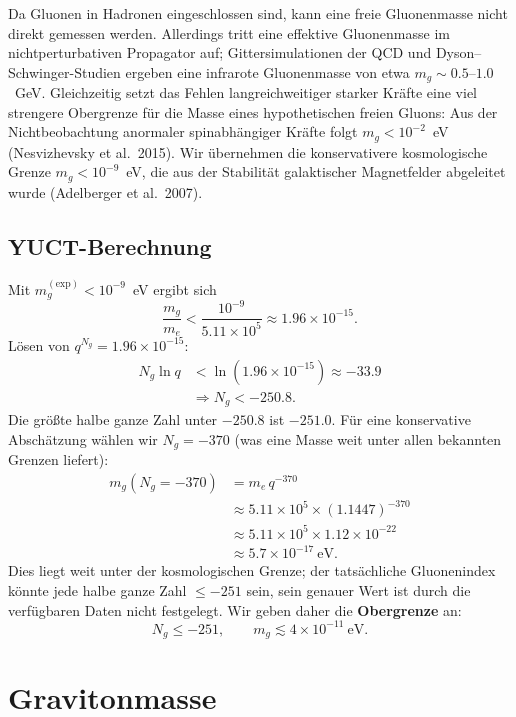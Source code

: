 \documentclass[12pt,a4paper]{article}
\begin{document}
	Da Gluonen in Hadronen eingeschlossen sind, kann eine freie Gluonenmasse nicht direkt gemessen werden.
	Allerdings tritt eine effektive Gluonenmasse im nichtperturbativen Propagator auf; Gittersimulationen der QCD
	und Dyson–Schwinger-Studien ergeben eine infrarote Gluonenmasse von etwa $m_g \sim 0.5$–$1.0$~GeV. Gleichzeitig
	setzt das Fehlen langreichweitiger starker Kräfte eine viel strengere Obergrenze für die Masse eines hypothetischen
	freien Gluons: Aus der Nichtbeobachtung anormaler spinabhängiger Kräfte folgt $m_g < 10^{-2}$~eV (Nesvizhevsky et al.\ 2015).
	Wir übernehmen die konservativere kosmologische Grenze $m_g < 10^{-9}$~eV, die aus der Stabilität galaktischer
	Magnetfelder abgeleitet wurde (Adelberger et al.\ 2007).
	
	\subsection{YUCT-Berechnung}
	
	Mit $m_g^{\mathrm{(exp)}} < 10^{-9}$~eV ergibt sich
	\[
	\frac{m_g}{m_e} < \frac{10^{-9}}{5.11\times10^5} \approx 1.96\times 10^{-15}.
	\]
	Lösen von $q^{N_g} = 1.96\times10^{-15}$:
	\[
	\begin{aligned}
		N_g \ln q &< \ln(1.96\times10^{-15}) \approx -33.9 \\
		&\Longrightarrow N_g < -250.8 .
	\end{aligned}
	\]
	Die größte halbe ganze Zahl unter $-250.8$ ist $-251.0$. Für eine konservative Abschätzung wählen wir
	$N_g = -370$ (was eine Masse weit unter allen bekannten Grenzen liefert):
	\[
	\begin{aligned}
		m_g(N_g = -370) &= m_e \, q^{-370} \\
		&\approx 5.11\times10^5 \times (1.1447)^{-370} \\
		&\approx 5.11\times10^5 \times 1.12\times10^{-22} \\
		&\approx 5.7 \times 10^{-17}~\mathrm{eV}.
	\end{aligned}
	\]
	Dies liegt weit unter der kosmologischen Grenze; der tatsächliche Gluonenindex könnte jede halbe ganze
	Zahl $\le -251$ sein, sein genauer Wert ist durch die verfügbaren Daten nicht festgelegt. Wir geben daher
	die \textbf{Obergrenze} an:
	\[
	\boxed{N_g \le -251}, \qquad
	\boxed{m_g \lesssim 4 \times 10^{-11}~\mathrm{eV}} .
	\]
	
	\section{Gravitonmasse}
	
\end{document}
